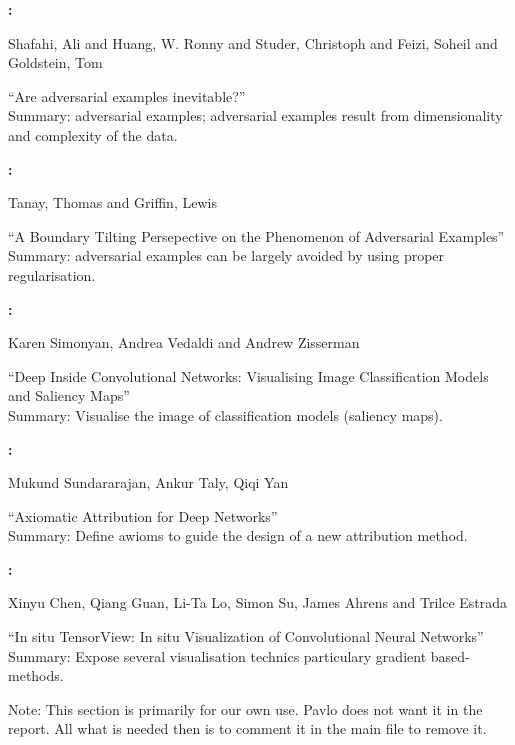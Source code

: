 \textbf{\cite{Shafahi2018}:}

Shafahi, Ali and Huang, W. Ronny and Studer, Christoph and Feizi, Soheil and Goldstein, Tom

``Are adversarial examples inevitable?''\\
Summary: adversarial examples; adversarial examples result from dimensionality and complexity of the data.


\textbf{\cite{Tanay2016}:}

Tanay, Thomas and Griffin, Lewis

``A Boundary Tilting Persepective on the Phenomenon of Adversarial Examples''\\
Summary: adversarial examples can be largely avoided by using proper regularisation.

\textbf{\cite{Simonyan2014}:}

Karen Simonyan, Andrea Vedaldi and Andrew Zisserman

``Deep Inside Convolutional Networks: Visualising Image Classification Models and Saliency Maps''\\
Summary: Visualise the image of classification models (saliency maps).

\textbf{\cite{Sundararajan2017}:}

Mukund Sundararajan, Ankur Taly, Qiqi Yan

``Axiomatic Attribution for Deep Networks''\\
Summary: Define awioms to guide the design of a new attribution method.

\textbf{\cite{Insitu-CNN-visualization}:}

Xinyu Chen, Qiang Guan, Li-Ta Lo, Simon Su, James Ahrens and Trilce Estrada

``In situ TensorView: In situ Visualization of
Convolutional Neural Networks''\\
Summary: Expose several visualisation technics particulary gradient based-methods.



Note: This section is primarily for our own use. Pavlo does not want it in the report. All what is needed then is to comment it in the main file to remove it.









